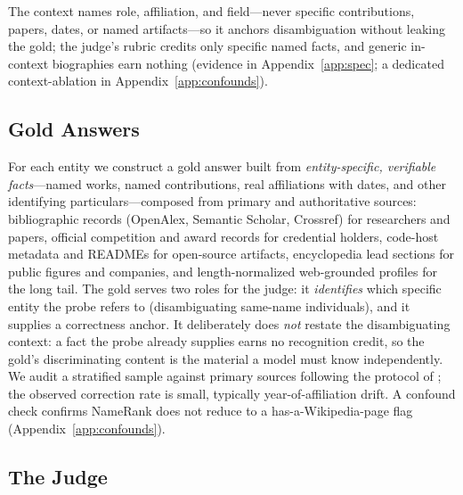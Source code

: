 \documentclass[11pt]{article}
\begin{document}
The context names role, affiliation, and field---never specific contributions, papers, dates, or named artifacts---so it anchors disambiguation without leaking the gold; the judge's rubric credits only specific named facts, and generic in-context biographies earn nothing (evidence in Appendix~\ref{app:spec}; a dedicated context-ablation in Appendix~\ref{app:confounds}).

\subsection{Gold Answers}
\label{sec:gold}

For each entity we construct a gold answer built from \emph{entity-specific, verifiable facts}---named works, named contributions, real affiliations with dates, and other identifying particulars---composed from primary and authoritative sources: bibliographic records (OpenAlex, Semantic Scholar, Crossref) for researchers and papers, official competition and award records for credential holders, code-host metadata and READMEs for open-source artifacts, encyclopedia lead sections for public figures and companies, and length-normalized web-grounded profiles for the long tail. The gold serves two roles for the judge: it \emph{identifies} which specific entity the probe refers to (disambiguating same-name individuals), and it supplies a correctness anchor. It deliberately does \emph{not} restate the disambiguating context: a fact the probe already supplies earns no recognition credit, so the gold's discriminating content is the material a model must know independently. We audit a stratified sample against primary sources following the protocol of \citet{li2026ikp}; the observed correction rate is small, typically year-of-affiliation drift. A confound check confirms NameRank does not reduce to a has-a-Wikipedia-page flag (Appendix~\ref{app:confounds}).

\subsection{The Judge}
\label{sec:method-judge}
\end{document}
